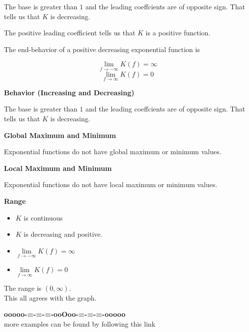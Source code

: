 \documentclass{ximera}
\begin{document}
\begin{example}
The base is greater than $1$ and the leading coeffcients are of opposite sign.  That tells us that $K$ is decreasing.

The positive leading coefficient tells us that $K$ is a positive function.


The end-behavior of a positive decreasing exponential function is


\[ \lim\limits_{f \to -\infty} K(f) = \infty \]
\[ \lim\limits_{f \to \infty} K(f) = 0 \]



\textbf{Behavior (Increasing and Decreasing)}


The base is greater than $1$ and the leading coeffcients are of opposite sign.  That tells us that $K$ is decreasing.



\textbf{Global Maximum and Minimum}

Exponential functions do not have global maximum or minimum values.





\textbf{Local Maximum and Minimum}

Exponential functions do not have local maximum or minimum values.



\textbf{Range}

\begin{itemize}
\item $K$ is continuous
\item $K$ is decreasing and positive.
\item $\lim\limits_{f \to -\infty} K(f) = \infty $
\item $\lim\limits_{f \to \infty} K(f) = 0$
\end{itemize}


The range is $(0, \infty)$. \\







This all agrees with the graph. \\


\end{example}












\begin{center}
\textbf{\textcolor{green!50!black}{ooooo-=-=-=-ooOoo-=-=-=-ooooo}} \\

more examples can be found by following this link\\ 

\end{center}
\end{document}
